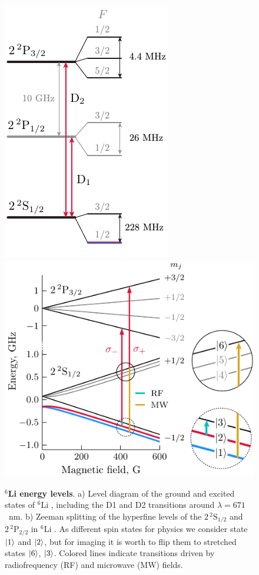 




\begin{figure}
    \centering
    \includegraphics{fig-ai/li-levels-base.pdf}
    \hspace{1cm}
    \includegraphics{fig-ai/li6-zeeman-broken-ai.pdf}
    \caption[${}^6$Li energy levels]{
        \textbf{${}^6$Li energy levels}. 
        a) Level diagram of the ground and excited states of ${}^6$Li \cite{gehm_preparation_2003}, including the D1 and D2 transitions around $\lambda = 671$~nm. 
        b) Zeeman splitting of the hyperfine levels of the $2\, {}^2\mathrm{S}_{1/2}$ and $2\, {}^2\mathrm{P}_{2/2}$ in ${}^6$Li \cite{serwane_deterministic_2011, sibalic_arc_2017}. As different spin states for physics we consider state $\left| 1 \right\rangle$ and $\left| 2 \right\rangle$, but for imaging it is worth to flip them to stretched states $\left| 6 \right\rangle$, $\left| 3 \right\rangle$. Colored lines indicate transitions driven by radiofrequency (RF) and microwave (MW) fields.
    }
    \label{fig:li6levels}
\end{figure}


